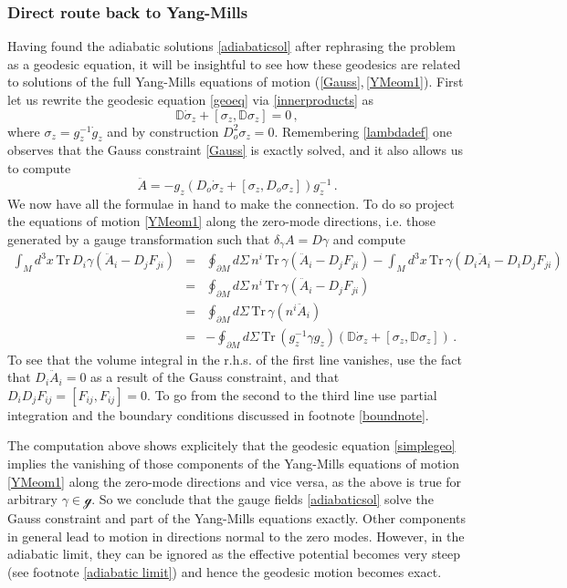 \documentclass[11pt,a4paper]{article}
\def\calsg{{\boldsymbol{\mathscr g}}}
\def\Tr{\mathrm{Tr}}
\def\Dperp{{\mathbb{D}}}
\begin{document}
    \subsubsection{Direct route back to Yang-Mills}\label{seceoms}
    Having found the adiabatic solutions \eqref{adiabaticsol} after rephrasing the problem as a geodesic equation, it will be insightful to see how these geodesics are related to solutions of the full Yang-Mills equations of motion (\ref{Gauss},\,\ref{YMeom1}). First let us rewrite the geodesic equation \eqref{geoeq} via \eqref{innerproducts} as
    \begin{equation}
    \Dperp\dot \sigma_z+[\sigma_z,\Dperp\sigma_z]=0\,,\label{simplegeo}
    \end{equation}
    where $\sigma_z=g^{-1}_z\dot g_z$ and by construction $D_o^2\sigma_z=0$. Remembering \eqref{lambdadef} one observes that the Gauss constraint \eqref{Gauss} is exactly solved, and it also allows us to compute
    \begin{equation}
    \ddot A=-g_z(D_o\dot \sigma_z+[\sigma_z,D_o\sigma_z])g_z^{-1}\,.
    \end{equation}
    We now have all the formulae in hand to make the connection. To do so project the equations of motion \eqref{YMeom1} along the zero-mode directions, i.e. those generated by a gauge transformation such that $\delta_\gamma A=D\gamma$ and compute
    \begin{eqnarray}
\nonumber    \int_M d^3x\,\Tr\, D_i\gamma(\ddot A_i-D_jF_{ji})&=&\oint_{\partial M}\!\! d\Sigma\, n^i\, \Tr\,\gamma\left(\ddot A_i-D_{j}F_{ji}\right)-\int_M d^3 x\, \Tr\,\gamma\left(D_i\ddot A_i-D_iD_{j}F_{ji}\right)\\
\nonumber &=&\oint_{\partial M}\!\! d\Sigma\, n^i\, \Tr\,\gamma\left(\ddot A_i-D_{j}F_{ji}\right)\\
\nonumber    &=&\oint_{\partial M}\!\! d\Sigma \, \Tr\,\gamma\left(n^i\ddot A_i\right)\\
    &=&-\oint_{\partial M}\!\! d\Sigma \, \Tr\,(g_z^{-1}\gamma g_z)\left(\Dperp \dot\sigma_z+[\sigma_z,\Dperp \sigma_z]\right)\,.\label{geodesic vs eom}
    \end{eqnarray}
    To see that the volume integral in the r.h.s. of the first line vanishes, use the fact that $D_i\ddot A_i=0$ as a result of the Gauss constraint, and that $D_{i}D_{j}F_{ij}=[F_{ij},F_{ij}]=0$. To go from the second to the third line use partial integration and the boundary conditions discussed in footnote \ref{boundnote}.
    
    The computation above shows explicitely that the geodesic equation \eqref{simplegeo} implies the vanishing of those components of the Yang-Mills equations of motion \eqref{YMeom1} along the zero-mode directions and vice versa, as the above is true for arbitrary $\gamma\in\calsg$. So we conclude that the gauge fields \eqref{adiabaticsol} solve the Gauss constraint and part of the Yang-Mills equations exactly. Other components in general lead to motion in directions normal to the zero modes. However, in the adiabatic limit, they can be ignored as the effective potential becomes very steep (see footnote \ref{adiabatic limit}) and hence the geodesic motion becomes exact.
    
\end{document}

